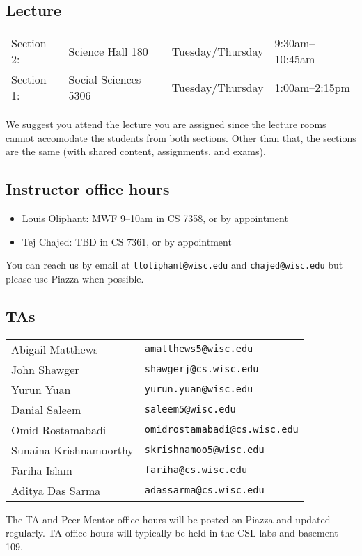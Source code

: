 \subsection*{Lecture}
\begin{tabular}{llll}
  Section 2: & Science Hall 180 & Tuesday/Thursday & 9:30am--10:45am \\
  Section 1: & Social Sciences 5306 & Tuesday/Thursday & 1:00am--2:15pm
\end{tabular}

We suggest you attend the lecture you are assigned since the lecture rooms
cannot accomodate the students from both sections. Other than that, the sections
are the same (with shared content, assignments, and exams).

\subsection*{Instructor office hours}
\begin{itemize}
  \item Louis Oliphant: MWF 9--10am in CS 7358, or by appointment
  \item Tej Chajed: TBD in CS 7361, or by appointment
\end{itemize}

You can reach us by email at \texttt{ltoliphant@wisc.edu} and
\texttt{chajed@wisc.edu} but please use Piazza when possible.

\subsection*{TAs}
\begin{tabular}{ll}
Abigail Matthews & \texttt{amatthews5@wisc.edu} \\
John Shawger & \texttt{shawgerj@cs.wisc.edu} \\
Yurun Yuan & \texttt{yurun.yuan@wisc.edu} \\
Danial Saleem & \texttt{saleem5@wisc.edu} \\
Omid Rostamabadi & \texttt{omidrostamabadi@cs.wisc.edu} \\
Sunaina Krishnamoorthy & \texttt{skrishnamoo5@wisc.edu} \\
Fariha Islam & \texttt{fariha@cs.wisc.edu} \\
Aditya Das Sarma & \texttt{adassarma@cs.wisc.edu} \\
\end{tabular}

The TA and Peer Mentor office hours will be posted on Piazza and updated
regularly. TA office hours will typically be held in the CSL labs and basement
109.

